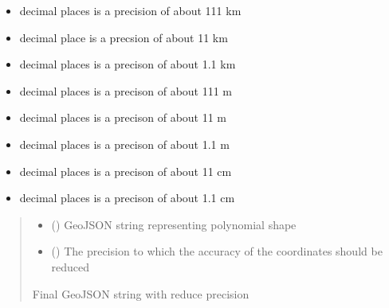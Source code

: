 \documentclass[letterpaper,10pt,english]{sphinxmanual}
\begin{document}
\begin{fulllineitems}
\label{\detokenize{geo_utilities:geo_utilities.reduce_coordinates_precision}}
\pysigstartsignatures
{}
\pysigstopsignatures\begin{description}
\begin{itemize}
\item {} 
 decimal places is a precision of about 111 km

\item {} 
 decimal place is a precsion of about 11 km

\item {} 
 decimal places is a precison of about 1.1 km

\item {} 
 decimal places is a precison of about 111 m

\item {} 
 decimal places is a precison of about 11 m

\item {} 
 decimal places is a precison of about 1.1 m

\item {} 
 decimal places is a precison of about 11 cm

\item {} 
 decimal places is a precison of about 1.1 cm

\end{itemize}

\end{description}
\begin{quote}\begin{description}
\begin{itemize}
\item {} 
\sphinxAtStartPar
{} () \textendash{} GeoJSON string representing polynomial shape

\item {} 
\sphinxAtStartPar
{} () \textendash{} The precision to which the accuracy of the coordinates should be reduced

\end{itemize}

\sphinxAtStartPar
{}

\sphinxAtStartPar
Final GeoJSON string with reduce precision

\end{description}\end{quote}

\end{fulllineitems}
\end{document}
